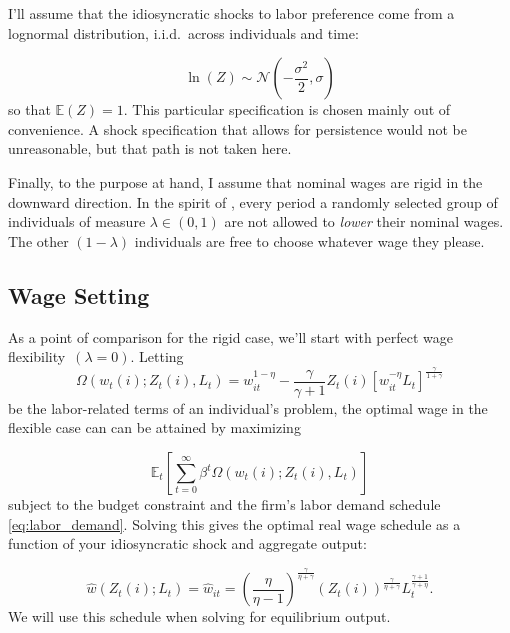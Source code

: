 \documentclass[12pt,a4paper]{scrartcl}            %
\begin{document}
I'll assume that the idiosyncratic shocks to labor preference come from a lognormal distribution, i.i.d.\ across individuals and time:

\begin{equation}
    \label{eq:shock_dist}
    \ln(Z) \sim \mathcal{N}\left(-\frac{\sigma^2}{2}, \sigma\right)
\end{equation}
%
so that $\mathbb{E}(Z) = 1$.
This particular specification is chosen mainly out of convenience.
A shock specification that allows for persistence would not be unreasonable, but that path is not taken here.


Finally, to the purpose at hand, I assume that nominal wages are rigid in the downward direction.
In the spirit of \cite{calvo_1983}, every period a randomly selected group of individuals of measure $\lambda \in \left(0, 1\right)$ are not allowed to \emph{lower} their nominal wages.
The other $\left(1 - \lambda \right)$ individuals are free to choose whatever wage they please.
\subsection{Wage Setting}
\label{sub:wage_setting}

As a point of comparison for the rigid case, we'll start with perfect wage flexibility~$(\lambda = 0)$.
Letting
\begin{equation}
    \label{eq:labor_part}
    \Omega( w_t(i); Z_t(i), L_t ) = w_{it}^{1 - \eta} - \frac{\gamma}{\gamma + 1}Z_t(i)\left[ w_{it}^{-\eta}L_t \right]^{\frac{\gamma}{1 + \gamma}}
\end{equation}
%
be the labor-related terms of an individual's problem, the optimal wage in the flexible case can can be attained by maximizing

\begin{equation}
    \label{eq:labor_opt}
    \mathbb{E}_t\left[\sum_{t=0}^{\infty}\beta^t \Omega( w_t(i); Z_t(i), L_t ) \right]
\end{equation}
%
subject to the budget constraint and the firm's labor demand schedule \eqref{eq:labor_demand}.
Solving this gives the optimal real wage schedule as a function of your idiosyncratic shock and aggregate output:

\begin{equation}
    \label{eq:flex}
    \hat{w}(Z_t(i); L_t) = \hat{w}_{it} = \left( \frac{\eta}{\eta - 1} \right)^{\frac{\gamma}{\eta + \gamma}}\left( Z_t(i) \right)^{\frac{\gamma}{\eta + \gamma}} L_t^{\frac{\gamma + 1}{\gamma + \eta}}.
\end{equation}
%
We will use this schedule when solving for equilibrium output.
\end{document}
